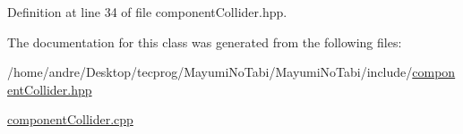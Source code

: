 Definition at line 34 of file component\-Collider.\-hpp.



The documentation for this class was generated from the following files\-:\begin{DoxyCompactItemize}
\item 
/home/andre/\-Desktop/tecprog/\-Mayumi\-No\-Tabi/\-Mayumi\-No\-Tabi/include/\hyperlink{component_collider_8hpp}{component\-Collider.\-hpp}\item 
\hyperlink{component_collider_8cpp}{component\-Collider.\-cpp}\end{DoxyCompactItemize}
